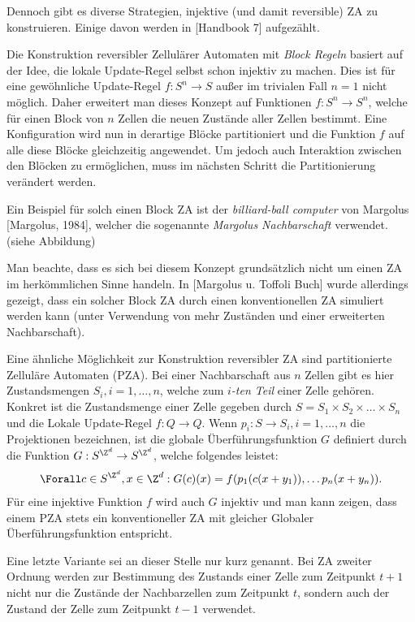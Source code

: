 Dennoch gibt es diverse Strategien, injektive (und damit reversible) ZA zu konstruieren. Einige davon werden in [Handbook 7] aufgezählt.

Die Konstruktion reversibler Zellulärer Automaten mit \textit{Block Regeln} basiert auf der Idee, die lokale Update-Regel selbst schon injektiv zu machen. Dies ist für eine gewöhnliche Update-Regel $f : S^n \to S$ außer im trivialen Fall $n = 1$ nicht möglich. Daher erweitert man dieses Konzept auf Funktionen $f: S^n \to S^n$, welche für einen Block von $n$ Zellen die neuen Zustände aller Zellen bestimmt. Eine Konfiguration wird nun in derartige Blöcke partitioniert und die Funktion $f$ auf alle diese Blöcke gleichzeitig angewendet. Um jedoch auch Interaktion zwischen den Blöcken zu ermöglichen, muss im nächsten Schritt die Partitionierung verändert werden.

Ein Beispiel für solch einen Block ZA ist der \textit{billiard-ball computer} von Margolus [Margolus, 1984], welcher die sogenannte \textit{Margolus Nachbarschaft} verwendet. (siehe Abbildung)

Man beachte, dass es sich bei diesem Konzept grundsätzlich nicht um einen ZA im herkömmlichen Sinne handeln. In [Margolus u. Toffoli Buch] wurde allerdings gezeigt, dass ein solcher Block ZA durch einen konventionellen ZA simuliert werden kann (unter Verwendung von mehr Zuständen und einer erweiterten Nachbarschaft).

Eine ähnliche Möglichkeit zur Konstruktion reversibler ZA sind partitionierte Zelluläre Automaten (PZA). Bei einer Nachbarschaft aus $n$ Zellen gibt es hier Zustandsmengen $S_i, i = 1, \dots, n$, welche zum \textit{$i$-ten Teil} einer Zelle gehören. Konkret ist die Zustandsmenge einer Zelle gegeben durch $S = S_1 \times S_2 \times \dots \times S_n$ und die Lokale Update-Regel $f: Q \to Q$. Wenn $p_i: S \to S_i, i = 1, \dots, n$ die Projektionen bezeichnen, ist die globale Überführungsfunktion $G$ definiert durch die Funktion $G: S^{\Z^d} \to S^{\Z^d}$, welche folgendes leistet:
\begin{align*}
  \Forall c \in S^{\Z^d}, x \in \Z^d: G(c)(x) = f(p_1(c(x+y_1)), \dots p_n(x+y_n)).
\end{align*}
Für eine injektive Funktion $f$ wird auch $G$ injektiv und man kann zeigen, dass einem PZA stets ein konventioneller ZA mit gleicher Globaler Überführungsfunktion entspricht.

Eine letzte Variante sei an dieser Stelle nur kurz genannt. Bei ZA zweiter Ordnung werden zur Bestimmung des Zustands einer Zelle zum Zeitpunkt $t+1$ nicht nur die Zustände der Nachbarzellen zum Zeitpunkt $t$, sondern auch der Zustand der Zelle zum Zeitpunkt $t-1$ verwendet.



